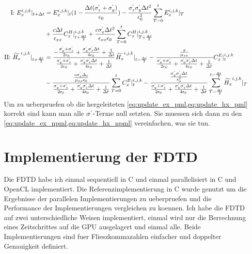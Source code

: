 \documentclass[11pt, ngerman]{article}
\begin{document}
\begin{align}
	\text{I: } \Ef{x}{i,j,k}{+} &= \Ef{x}{i,j,k}{0}(1-\frac{\Delta t(\sgma_z+\sgma_y)}{\epsilon_0}) - \frac{\sgma_z\sgma_y\Delta t^2}{\epsilon_0^2}\sum_{T=0}^t\Ef{x}{i,j,k}{T}\\
	&+ \frac{c\Delta t}{\epsilon_{xx}}\Ch{x}{i,j,k}{+} + \frac{c\sgma_x\Delta t^2}{\epsilon_{xx}\epsilon_0}\sum_{T=0}^t\Ch{x}{i,j,k}{T+} \label{eq:update_ex_pml}\\
	\text{II: } \Hf{x}{i,j,k}{+} &= \frac{\fone}{\mone}\Hf{x}{i,j,k}{-}-\frac{\frac{x}{\mu_{xx}}}{\mone}\Ce{x}{i,j,k}{0} \label{eq:update_hx_pml}\\
	&- \frac{\frac{c\sgma_x\Delta_t}{\mu_{xx}\epsilon_0}}{\mone}\sum_{T=0}^t\Ce{x}{i,j,k}{0}-\frac{\frac{\sgma_y\sgma_z\Delta t}{\epsilon_0^2}}{\mone}\sum_{T=\frac{\Delta t}{2}}^{t-\frac{\Delta t}{2}}\Hf{x}{i,j,k}{T}\\
\end{align}
Um zu ueberpruefen ob die hergeleiteten \cref{eq:update_ex_pml,eq:update_hx_pml} korrekt sind kann man alle \(\sigma^`\)-Terme null setzten. Sie muessen sich dann
zu den \cref{eq:update_ex_npml,eq:update_hx_npml} vereinfachen, was sie tun.

\section{Implementierung der FDTD}
Die FDTD habe ich einmal sequentiell in C und einmal parallelisiert in C und OpenCL implementiert.
Die Referenzimplementierung in C wurde genutzt um die Ergebnisse der parallelen Implementierungen
zu ueberpruefen und die Performance der Implementierungen vergleichen zu koennen.
Ich habe die FDTD auf zwei unterschiedliche Weisen implementiert, einmal wird nur die Berrechnung
eines Zeitschrittes auf die GPU ausgelagert und einmal alle. Beide Implementierungen sind fuer
Flieszkommazahlen einfacher und doppelter Genauigkeit definiert.
\end{document}
